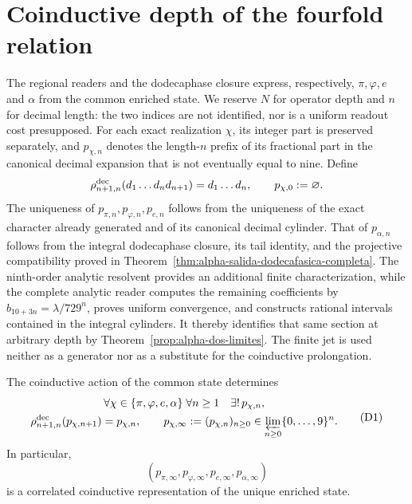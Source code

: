 \section{Coinductive depth of the fourfold relation}
\label{sec:profundidad-cuatrirrelacion-ch}

The regional readers and the dodecaphase closure express, respectively,
\(\pi,\varphi,e\) and \(\alpha\) from the common enriched state. We reserve
\(N\) for operator depth and \(n\) for decimal length: the two indices are
not identified, nor is a uniform readout cost presupposed. For each exact
realization \(\chi\), its integer part is preserved separately, and
\(p_{\chi,n}\) denotes the length-\(n\) prefix of its fractional part in the
canonical decimal expansion that is not eventually equal to nine. Define
\[
 \rho^{\rm dec}_{n+1,n}(d_1\ldots d_nd_{n+1})=d_1\ldots d_n,
 \qquad p_{\chi,0}:=\varnothing.
\]
The uniqueness of \(p_{\pi,n},p_{\varphi,n},p_{e,n}\) follows from the
uniqueness of the exact character already generated and of its canonical
decimal cylinder. That of \(p_{\alpha,n}\) follows from the integral
dodecaphase closure, its tail identity, and the projective compatibility
proved in Theorem~\ref{thm:alpha-salida-dodecafasica-completa}. The
ninth-order analytic resolvent provides an additional finite
characterization, while the complete analytic reader computes the remaining
coefficients by \(b_{10+3n}=\lambda/729^n\), proves uniform convergence, and
constructs rational intervals contained in the integral cylinders. It thereby
identifies that same section at arbitrary depth by
Theorem~\ref{prop:alpha-dos-limites}. The finite jet is used neither as a
generator nor as a substitute for the coinductive prolongation.

\begin{theorem}
\label{thm:profundidad-cuatrirrelacion-ch}
The coinductive action of the common state determines
\[
 \begin{gathered}
  \forall\chi\in\{\pi,\varphi,e,\alpha\}\;
  \forall n\ge1\quad\exists!\,p_{\chi,n},\\
  \rho^{\rm dec}_{n+1,n}(p_{\chi,n+1})=p_{\chi,n},
  \qquad
  p_{\chi,\infty}:=(p_{\chi,n})_{n\ge0}
  \in\varprojlim_{n\ge0}\{0,\ldots,9\}^{n}.
 \end{gathered}
\tag{D1}
\label{eq:profundidad-cuatrirrelacion-ch}
\]
In particular,
\[
 (p_{\pi,\infty},p_{\varphi,\infty},p_{e,\infty},p_{\alpha,\infty})
\tag{D2}
\label{eq:cuatrirrelacion-infinita-ch}
\]
is a correlated coinductive representation of the unique enriched state.
\end{theorem}


